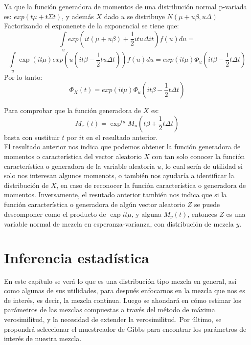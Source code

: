 \documentclass[11pt]{book}
\begin{document}
Ya que la función generadora de momentos de una distribución normal p-variada es: $exp(t\acute{}\mu + t\acute{}\Sigma t)$, y además $X$ dado $u$ se distribuye $N(\mu + u\beta, u\Delta)$ \\

Factorizando el exponenete de la exponencial se tiene que:\\
\begin{equation*}
\underset{u}{\int}exp(it(\mu+ u\beta)+\frac{1}{2}itu\Delta it)f(u)du=
\end{equation*}
\begin{equation*}
\underset{u}{\int}\exp(it\acute{}\mu)exp(u(it\acute{}\beta -\dfrac{1}{2}t\acute{}u \Delta t))f(u)du = exp(it\acute{}\mu)\Phi_{u}(it\beta-\frac{1}{2}t\Delta t)
\end{equation*}
Por lo tanto: 
\begin{equation*}
\Phi_{X}(t) = exp(it\acute{}\mu)\Phi_{u}(it\beta-\frac{1}{2}t\Delta t)
\end{equation*}

Para comprobar que la función generadora de $X$ es:
\begin{equation*}
M_{x}(t)=\exp^{t\acute{}\mu}M_{u}(t\beta+\dfrac{1}{2}t\acute{}\Delta t)
\end{equation*}
  basta con sustituir $t$ por $it$ en el resultado anterior.\\

El resultado anterior nos indica que podemos obtener la función generadora de momentos o característica del vector aleatorio $X$ con tan solo conocer la función característica o generadora de la variable aleatoria $u$, lo cual sería de utilidad si solo nos interesan algunos momenots, o también nos ayudaría a identificar la distribución de $X$, en caso de reconocer la función característica o generadora de momentos. Inversamente, el resutado anterior también nos indica que si la función característica o generadora de algún vector aleatorio $Z$ se puede descomponer como el producto de $\exp{it\acute{}\mu} $, y alguna $M_{y}(t)$, entonces $Z$ es una variable normal de mezcla en esperanza-varianza, con distribución de mezcla $y$.\\

\chapter*{Inferencia estadística}
En este capítulo se verá lo que es una distribución tipo mezcla en general, así como algunas de sus utilidades, para después enfocarnos en la mezcla que nos es de interés, es decir, la mezcla continua. Luego se ahondará en cómo estimar los parámetros de las mezclas compuestas a través del método de máxima verosimilitud, y la necesidad de extender la verosimilitud. Por último, se propondrá seleccionar el muestreador de Gibbs para encontrar los parámetros de interés de nuestra mezcla.\\
\end{document}
